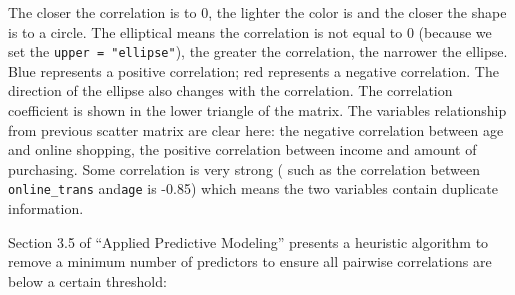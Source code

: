 \documentclass[12pt,]{krantz}
\makeatletter
\newenvironment{Shaded}{\begin{snugshade}}{\end{snugshade}}
\newcommand{\KeywordTok}[1]{\textcolor[rgb]{0.27,0.27,0.27}{\textbf{#1}}}
\newcommand{\DataTypeTok}[1]{\textcolor[rgb]{0.27,0.27,0.27}{#1}}
\newcommand{\DecValTok}[1]{\textcolor[rgb]{0.06,0.06,0.06}{#1}}
\newcommand{\StringTok}[1]{\textcolor[rgb]{0.5,0.5,0.5}{#1}}
\newcommand{\CommentTok}[1]{\textcolor[rgb]{0.37,0.37,0.37}{\textit{#1}}}
\newcommand{\NormalTok}[1]{#1}
\newenvironment{kframe}{%
\medskip{}
\setlength{\fboxsep}{.8em}
 \def\at@end@of@kframe{}%
 \ifinner\ifhmode%
  \def\at@end@of@kframe{\end{minipage}}%
  \begin{minipage}{\columnwidth}%
 \fi\fi%
 \def\FrameCommand##1{\hskip\@totalleftmargin \hskip-\fboxsep
 \colorbox{shadecolor}{##1}\hskip-\fboxsep
     \hskip-\linewidth \hskip-\@totalleftmargin \hskip\columnwidth}%
 \MakeFramed {\advance\hsize-\width
   \@totalleftmargin\z@ \linewidth\hsize
   \@setminipage}}%
 {\par\unskip\endMakeFramed%
 \at@end@of@kframe}
\renewenvironment{Shaded}{\begin{kframe}}{\end{kframe}}
\theoremstyle{definition}
\theoremstyle{definition}
\theoremstyle{definition}
\theoremstyle{remark}
\makeatother
\begin{document}
\begin{Shaded}
\end{Shaded}

The closer the correlation is to 0, the lighter the color is and the
closer the shape is to a circle. The elliptical means the correlation is
not equal to 0 (because we set the \texttt{upper\ =\ "ellipse"}), the
greater the correlation, the narrower the ellipse. Blue represents a
positive correlation; red represents a negative correlation. The
direction of the ellipse also changes with the correlation. The
correlation coefficient is shown in the lower triangle of the matrix.
The variables relationship from previous scatter matrix are clear here:
the negative correlation between age and online shopping, the positive
correlation between income and amount of purchasing. Some correlation is
very strong ( such as the correlation between \texttt{online\_trans}
and\texttt{age} is -0.85) which means the two variables contain
duplicate information.

Section 3.5 of ``Applied Predictive Modeling'' \citep{APM} presents a
heuristic algorithm to remove a minimum number of predictors to ensure
all pairwise correlations are below a certain threshold:
\end{document}
